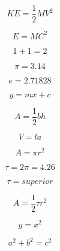 \documentclass[12pt, a4paper, oneside]{article}
\begin{document}
	$$ KE = \frac{1}{2} M V^{2} $$

	$$ E=MC^{2} $$

	$$ {1} + {1} = {2} $$

	$$ \pi={3.14} $$

	$$ e={2.71828} $$

	$$ y=mx+c $$

	$$ A=\frac{1}{2}bh $$

	$$ V=la $$

	$$ A=\pi{r}^2 $$

	$$ \tau={2}\pi={4.26} $$

	$$ \tau=superior $$

	$$ A=\frac{1}{2}\tau{r}^2 $$

	$$ y=x^{2} $$

	$$ a^{2}+b^{2}=c^{2} $$
	
\end{document}
